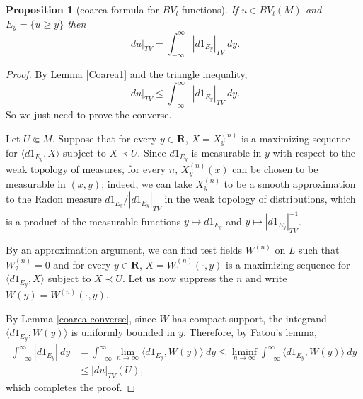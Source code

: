 \documentclass[reqno,12pt,letterpaper]{amsart}
\newcommand{\RR}{\mathbf{R}}
\newtheorem{proposition}[theorem]{Proposition}
\theoremstyle{definition}
\numberwithin{equation}{section}
\begin{document}
\begin{proposition}[coarea formula for $BV_l$ functions]\label{Coarea2}
If $u \in BV_l(M)$ and $E_y = \{u \geq y\}$ then
$$|du|_{TV} = \int_{-\infty}^\infty |d1_{E_y}|_{TV} ~dy.$$
\end{proposition}
\begin{proof}
By Lemma \ref{Coarea1} and the triangle inequality,
$$|du|_{TV} \leq \int_{-\infty}^\infty |d1_{E_y}|_{TV} ~dy.$$
So we just need to prove the converse.

Let $U \Subset M$.
Suppose that for every $y \in \RR$, $X = X^{(n)}_y$ is a maximizing sequence for $\langle d1_{E_y}, X\rangle$ subject to $X \prec U$.
Since $d 1_{E_y}$ is measurable in $y$ with respect to the weak topology of measures, for every $n$, $X^{(n)}_y(x)$ can be chosen to be measurable in $(x, y)$; indeed, we can take $X^{(n)}_y$ to be a smooth approximation to the Radon measure $d 1_{E_y}/|d 1_{E_y}|_{TV}$ in the weak topology of distributions, which is a product of the measurable functions $y \mapsto d 1_{E_y}$ and $y \mapsto |d 1_{E_y}|_{TV}^{-1}$.

By an approximation argument, we can find test fields $W^{(n)}$ on $L$ such that $W^{(n)}_2 = 0$ and for every $y \in \RR$, $X = W^{(n)}_1(\cdot, y)$ is a maximizing sequence for $\langle d 1_{E_y}, X\rangle$ subject to $X \prec U$.
Let us now suppress the $n$ and write $W(y) = W^{(n)}(\cdot, y)$.

By Lemma \ref{coarea converse}, since $W$ has compact support, the integrand $\langle d 1_{E_y}, W(y)\rangle$ is uniformly bounded in $y$.
Therefore, by Fatou's lemma,
\begin{align*}
\int_{-\infty}^\infty |d 1_{E_y}| ~dy &= \int_{-\infty}^\infty \lim_{n \to \infty} \langle d 1_{E_y}, W(y)\rangle ~dy \leq \liminf_{n \to \infty} \int_{-\infty}^\infty \langle d 1_{E_y}, W(y)\rangle ~dy \\
&\leq |d u|_{TV}(U),
\end{align*}
which completes the proof.
\end{proof}



\printbibliography
\end{document}
